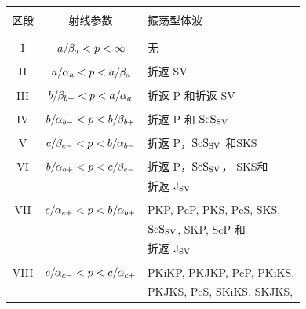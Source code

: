 \begin{table}[!t]
\centering
\begin{tabular}{|c|c|l|} \hline
& & \\
区段 & 射线参数 & 振荡型体波 \\
& & \\ \hline
& & \\
I & $\,a/\hspace{-0.2 mm}\beta_a<p<\infty$ & 无 \\ 
& & \\
II & $\,a/\hspace{-0.2 mm}\alpha_{a}<p<a/\hspace{-0.2 mm}\beta_a$ & 折返 SV \\
& & \\
III & $b/\hspace{-0.2 mm}\beta_{b+}<p<a/\hspace{-0.2 mm}\alpha_{a}$
& 折返 P 和折返 SV \\ & & \\
IV & $b/\hspace{-0.2 mm}\alpha_{b-}<p<b/\hspace{-0.2 mm}\beta_{b+}$ &
折返 P 和 ${\rm ScS}_{\rm SV}$ \\
& & \\
V & $c/\hspace{-0.2 mm}\beta_{c-}<p<b/\hspace{-0.2 mm}\alpha_{b-}$ &
折返 P，${\rm ScS}_{\rm SV}$ 
   和SKS \\
& & \\
VI & $b/\hspace{-0.2 mm}\alpha_{b+}<p<c/\hspace{-0.2 mm}\beta_{c-}$ &
折返 P，${\rm ScS}_{\rm SV}$，
SKS和 \\
& & 折返 ${\rm J}_{\rm SV}$ \\
& & \\
VII & $c/\hspace{-0.2 mm}\alpha_{c+}<p<b/\hspace{-0.2 mm}\alpha_{b+}$ &
PKP, PcP, PKS, PcS, SKS, \\
& & ${\rm ScS}_{\rm SV}$, SKP, ScP 和 \\
& & 折返 ${\rm J}_{\rm SV}$ \\
& & \\
VIII & $c/\hspace{-0.2 mm}\alpha_{c-}<p<c/\hspace{-0.2 mm}\alpha_{c+}$ &
PKiKP, PKJKP, PcP, PKiKS, \\
& &  PKJKS, PcS, SKiKS, SKJKS, \\

\end{tabular}
\end{table}
